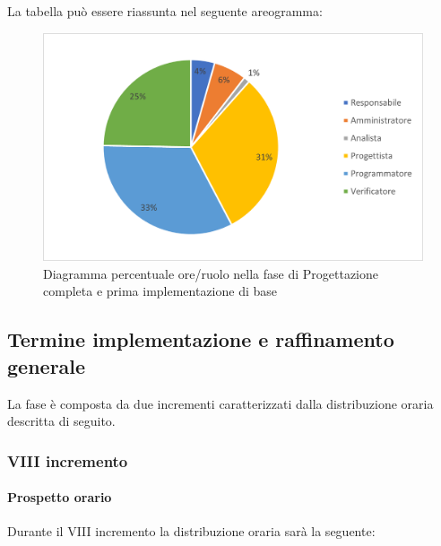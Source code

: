 La tabella può essere riassunta nel seguente areogramma:
\begin{figure}[H]
	\centering
	\includegraphics[width=0.8\linewidth]{res/images/preventivo/5-2.png}
	\caption{Diagramma percentuale ore/ruolo nella fase di Progettazione completa e prima implementazione di base}
	\label{fig:diagramma costi ruolo fase progettazione completa e prima implementazione di base}
\end{figure}

\subsection{Termine implementazione e raffinamento generale}
La fase è composta da due incrementi caratterizzati dalla distribuzione oraria descritta di seguito.

\subsubsection{VIII incremento}
\paragraph{Prospetto orario}
Durante il VIII incremento la distribuzione oraria sarà la seguente:


